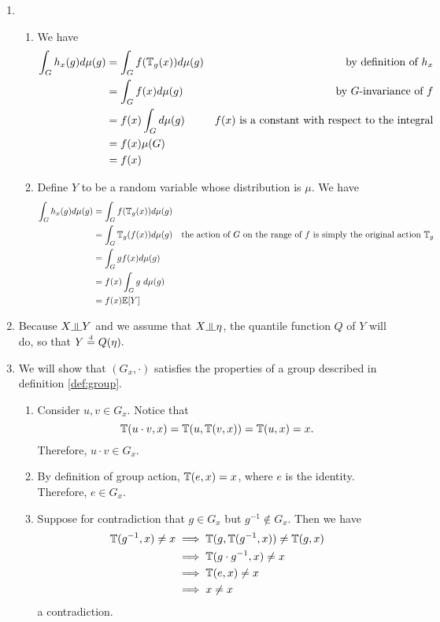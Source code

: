 \begin{enumerate}
\item
\begin{enumerate}[label=(\alph*)]
	\item
	We have
	$$
	\begin{aligned}
		\int_{G} h_x(g) d \mu(g) & = \int_G f(\mathbb{T}_g(x)) d \mu(g) & \textrm{by definition of $h_x$} \\
		                         & = \int_G f(x) d \mu(g) & \textrm{by $G$-invariance of $f$} \\
		                         & = f(x) \int_G d \mu(g) & \textrm{$f(x)$ is a constant with respect to the integral} \\
		                         & = f(x) \mu(G) \\
		                         & = f(x)
	\end{aligned}
	$$
	
	\item
	Define $Y$ to be a random variable whose distribution is $\mu$.
	We have
	$$
	\begin{aligned}
		\int_G h_x(g) d \mu(g) & = \int_G f(\mathbb{T}_g(x)) d \mu(g) \\
		                       & = \int_G \mathbb{T}_g(f(x)) d \mu(g) & \textrm{the action of $G$ on the range of $f$ is simply the original action $\mathbb{T}_g$} \\ 
		                       & = \int_G g f(x) d \mu(g) \\
		                       & = f(x) \int_G g\ d \mu(g) \\
		                       & = f(x) \mathbb{E}[Y]
	\end{aligned}
	$$
\end{enumerate}

\item 
Because $X \indep Y$ and we assume that $X \indep \eta$, the quantile function $Q$ of $Y$ will do, so that
$
	Y \stackrel{\text{\rm\tiny d}}{=} Q(\eta).
$

\item We will show that $(G_x, \cdot)$ satisfies the properties of a group described in definition \ref{def:group}.
\begin{enumerate}
	\item
	Consider $u,v \in G_x$.
	Notice that
	$$
		\mathbb{T}(u \cdot v, x) = \mathbb{T}(u, \mathbb{T}(v,x)) = \mathbb{T}(u, x) = x.
	$$
	Therefore, $u \cdot v \in G_x$.
	
	\item
	By definition of group action, $\mathbb{T}(e,x) = x$, where $e$ is the identity.
	Therefore, $e \in G_x$.
	
	\item
	Suppose for contradiction that $g \in G_x$ but $g^{-1} \not \in G_x$.
	Then we have
	$$
	\begin{aligned} 
		\mathbb{T}(g^{-1},x) \neq x & \implies \mathbb{T}(g, \mathbb{T}(g^{-1}, x)) \neq \mathbb{T}(g, x) \\
		& \implies \mathbb{T}(g\cdot g^{-1}, x) \neq x \\
		& \implies \mathbb{T}(e, x) \neq x \\
		& \implies x \neq x
	\end{aligned}
	$$
	a contradiction.
\end{enumerate}
\end{enumerate}

